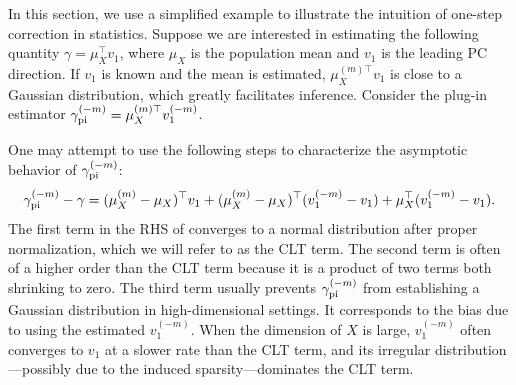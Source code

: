 \documentclass[11pt]{article}
\newenvironment{revblock}
  {\color{teal}}
  {}
\begin{document}
\begin{revblock}
In this section, we use a simplified example to illustrate the intuition of one-step correction in statistics. Suppose we are interested in estimating the following quantity $\gamma = \mu_X^\top v_1$, where $\mu_X$ is the population mean and $v_1$ is the leading PC direction. If $v_1$ is known and the mean is estimated, $\mu_X^{(m)\top} v_1$ is close to a Gaussian distribution, which greatly facilitates inference. Consider the plug-in estimator $ \gamma_{\rm pi}^{(-m)} = \mu_X^{(m) \top} v_1^{(-m)}$.



One may attempt to use the following steps to characterize the asymptotic behavior of $\gamma_{\rm pi}^{(-m)}$:
\begin{equation}\label{eq: example decomposition}
      \gamma_{\rm pi}^{(-m)} - \gamma =  (\mu_X^{(m)} - \mu_X)^\top v_1 +  (\mu_X^{(m)} - \mu_X)^\top(v_1^{(-m)} - v_1)+ \mu_X^\top (v_1^{(-m)} - v_1).
\end{equation}
The first term in the RHS of  converges to a normal distribution after proper normalization, which we will refer to as the CLT term. The second term is often of a higher order than the CLT term because it is a product of two terms both shrinking to zero.
The third term usually prevents $\gamma_{\rm pi}^{(-m)}$ from establishing a Gaussian distribution in high-dimensional settings. It corresponds to the bias due to using the estimated $v_1^{(-m)}$. When the dimension of $X$ is large, $v_1^{(-m)}$ often converges to $v_1$ at a slower rate than the CLT term, and its irregular distribution---possibly due to the induced sparsity---dominates the CLT term.  


\end{revblock}
\end{document}
